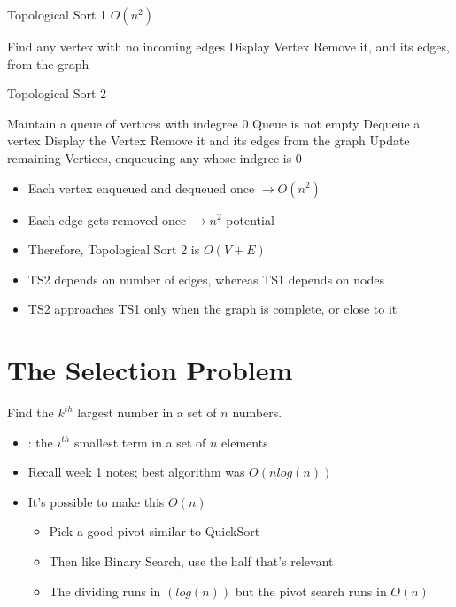 \pagebreak

\begin{algorithm}
    \caption{Topological Sort 1 $O(n^2)$}
    \begin{algorithmic}
            \State Find any vertex with no incoming edges
            \State Display Vertex
            \State Remove it, and its edges, from the graph
        \EndWhile
    \end{algorithmic}
\end{algorithm}

\begin{algorithm}
    \caption{Topological Sort 2}
    \begin{algorithmic}
        \State Maintain a queue of vertices with indegree $0$
        \While Queue is not empty
            \State Dequeue a vertex
            \State Display the Vertex
            \State Remove it and its edges from the graph
            \State Update remaining Vertices, enqueueing any whose indgree is $0$
        \EndWhile
    \end{algorithmic}
\end{algorithm}

\begin{itemize}
    \item Each vertex enqueued and dequeued once $\rightarrow O(n^2)$
    \item Each edge gets removed once $\rightarrow n^2$ potential
    \item Therefore, Topological Sort 2 is $O(V+E)$
    \item TS2 depends on number of edges, whereas TS1 depends on nodes
    \item TS2 approaches TS1 only when the graph is complete, or close to it
\end{itemize}

\section*{The Selection Problem}

Find the $k^{th}$ largest number in a set of $n$ numbers.

\begin{itemize}

    \item {}: the $i^{th}$ smallest term in a set of $n$ elements
    \item Recall week 1 notes; best algorithm was $O(nlog(n))$
    \item It's possible to make this $O(n)$
    \begin{itemize}
        \item Pick a good pivot similar to QuickSort
        \item Then like Binary Search, use the half that's relevant
        \item The dividing runs in $(log(n))$ but the pivot search runs in $O(n)$
    \end{itemize}

\end{itemize}


